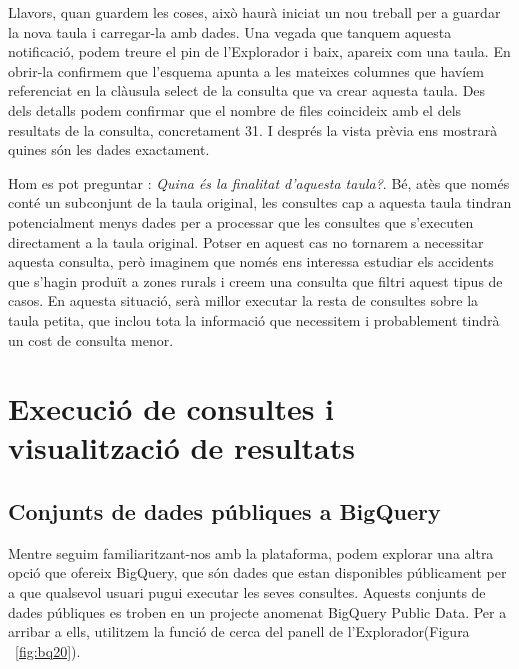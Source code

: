\documentclass[12pt,longbibliography]{article}
\theoremstyle{definition}
\theoremstyle{remark}
\begin{document}
Llavors, quan guardem les coses, això haurà iniciat un nou treball per a guardar la nova taula i carregar-la amb dades. Una vegada que tanquem aquesta notificació, podem treure el pin de l'Explorador i baix, apareix com una taula. En obrir-la confirmem que l'esquema apunta a les mateixes columnes que havíem referenciat en la clàusula select de la consulta que va crear aquesta taula. Des dels detalls podem confirmar que el nombre de files coincideix amb el dels resultats de la consulta, concretament 31. I després la vista prèvia ens mostrarà quines són les dades exactament. 

\vspace{2mm}

Hom es pot preguntar : \textit{Quina és la finalitat d'aquesta taula?}. Bé, atès que només conté un subconjunt de la taula original, les consultes cap a aquesta taula tindran potencialment menys dades per a processar que les consultes que s'executen directament a la taula original. Potser en aquest cas no tornarem a necessitar aquesta consulta, però imaginem que només ens interessa estudiar els accidents que s'hagin produït a zones rurals i creem una consulta que filtri aquest tipus de casos. En aquesta situació, serà millor executar la resta de consultes sobre la taula petita, que inclou tota la informació que necessitem i probablement tindrà un cost de consulta menor.

\newpage

\section{Execució de consultes i visualització de resultats}

\subsection{Conjunts de dades públiques a BigQuery}

Mentre seguim familiaritzant-nos amb la plataforma, podem explorar una altra opció que ofereix BigQuery, que són dades que estan disponibles públicament per a que qualsevol usuari pugui executar les seves consultes. Aquests conjunts de dades públiques es troben en un projecte anomenat BigQuery Public Data. Per a arribar a ells, utilitzem la funció de cerca del panell de l'Explorador(Figura ~\ref{fig:bq20}).
\end{document}
